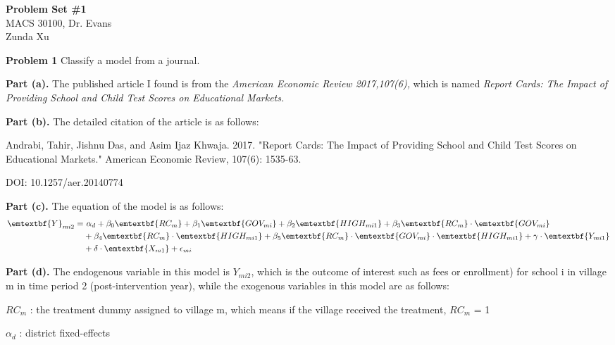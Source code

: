 \documentclass[letterpaper,12pt]{article}
\theoremstyle{definition}
\begin{document}
\begin{flushleft}
  \textbf{\large{Problem Set \#1}} \\
  MACS 30100, Dr. Evans \\
  Zunda Xu
\end{flushleft}

\vspace{5mm}

\noindent\textbf{Problem 1}
Classify a model from a journal.

\noindent\textbf{Part (a).} The published article I found is from the \emph{American Economic Review 2017,107(6),} which is named \emph{Report Cards: The Impact of Providing School and Child
Test Scores on Educational Markets.}

\noindent\textbf{Part (b).} The detailed citation of the article is as follows: 

\noindent Andrabi, Tahir, Jishnu Das, and Asim Ijaz Khwaja. 2017. "Report Cards: The Impact of Providing School and Child Test Scores on Educational Markets." American Economic Review, 107(6): 1535-63.

\noindent DOI: 10.1257/aer.20140774

\noindent\textbf{Part (c).} The equation of the model is as follows:
\begin{equation*}
\begin{split}
 \emtextbf{Y}_{mi2} = 
 & ~\alpha_{d} + \beta_{0}\emtextbf{RC_{m}} + \beta_{1}\emtextbf{GOV_{mi}} + \beta_{2}\emtextbf{HIGH_{mi1}} + \beta_{3}\emtextbf{RC_{m}} \cdot \emtextbf{GOV_{mi}} \\ 
 & + \beta_{4}\emtextbf{RC_{m}} \cdot \emtextbf{HIGH_{mi1}} + \beta_{5}\emtextbf{RC_{m}} \cdot \emtextbf{GOV_{mi}} \cdot \emtextbf{HIGH_{mi1}} + \gamma \cdot \emtextbf{Y_{mi1}} \\ 
 & + \delta \cdot \emtextbf{X_{m1}} + \epsilon_{mi}
\end{split}
\end{equation*}

\noindent\textbf{Part (d).} The endogenous variable in this model is $Y_{mi2}$, which is the outcome of interest such as fees or enrollment) for school i in village m in time period 2 (post-intervention year), while the exogenous variables in this model are as follows: 

\noindent $RC_{m}$ : the treatment dummy assigned to village m, which means if the village received the treatment, ${RC_{m}}$ = 1

\noindent $\alpha_{d}$ :  district fixed-effects
\end{document}
